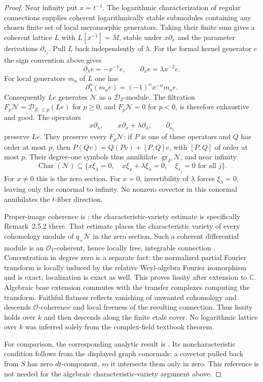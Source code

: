 \documentclass[11pt]{article}
\numberwithin{equation}{section}
\theoremstyle{definition}
\theoremstyle{remark}
\newcommand{\C}{\mathbb C}
\newcommand{\Ocal}{\mathcal O}
\newcommand{\Dcal}{\mathcal D}
\newcommand{\Ncal}{\mathcal N}
\newcommand{\gr}{\operatorname{gr}}
\begin{document}
\begin{proof}
Near infinity put $x=t^{-1}$. The logarithmic characterization of
regular connections \cite[Theorem~5.3.7]{HTT} supplies coherent
logarithmically stable submodules containing any chosen finite set of
local meromorphic generators. Taking their finite sum gives a coherent
lattice $L$ with $L[x^{-1}]=\overline M$, stable under
$x\partial_x$ and the parameter derivations $\partial_{s_j}$.
Pull $L$ back independently of $\lambda$. For the formal kernel generator
$e$ the sign convention above gives
\[
 \partial_\lambda e=-x^{-1}e,\qquad
 \partial_x e=\lambda x^{-2}e.
\]
For local generators $m_a$ of $L$ one has
\[
 \partial_\lambda^n(m_ae)=(-1)^n x^{-n}m_ae.
\]
Consequently $Le$ generates $\Ncal$ as a $\Dcal_Z$-module. The filtration
$F_p\Ncal=\Dcal_{Z,\le p}(Le)$ for $p\ge0$, and $F_p\Ncal=0$ for $p<0$,
is therefore exhaustive and good. The operators
\[
 x\partial_\lambda,\qquad
 x\partial_x+\lambda\partial_\lambda,\qquad
 \partial_{s_j}
\]
preserve $Le$. They preserve every $F_p\Ncal$: if $P$ is one of these
operators and $Q$ has order at most $p$, then
$P(Qv)=Q(Pv)+[P,Q]v$, with $[P,Q]$ of order at most $p$.
Their degree-one symbols thus annihilate $\gr_F\Ncal$, and near infinity
\begin{equation}\label{eq:fourier-infinity-characteristic}
 \operatorname{Char}(\Ncal)\subseteq
 \{x\xi_\lambda=0,\quad x\xi_x+\lambda\xi_\lambda=0,\quad
                         \xi_{s_j}=0\text{ for all }j\}.
\end{equation}
For $x\ne0$ this is the zero section. For $x=0$, invertibility of
$\lambda$ forces $\xi_\lambda=0$, leaving only the conormal to infinity.
No nonzero covector in this conormal annihilates the $t$-fiber direction.

Proper-image coherence is \cite[Theorem~2.5.1]{HTT}; the
characteristic-variety estimate is specifically Remark~2.5.2 there.
That estimate places the characteristic variety of every cohomology
module of $q_+\Ncal$ in the zero section.
Such a coherent differential module is an $\Ocal_Y$-coherent, hence
locally free, integrable connection \cite[Proposition~2.2.5]{HTT}.
Concentration in degree zero is a separate fact: the normalized partial
Fourier transform is locally induced by the relative Weyl-algebra
Fourier isomorphism and is exact; localization is exact as well.
This proves lissity after extension to $\C$. Algebraic base extension
commutes with the transfer complexes computing the transform. Faithful
flatness reflects vanishing of unwanted cohomology and descends
$\Ocal$-coherence and local freeness of the resulting connection.
Thus lissity holds over $k$ and then descends along the finite etale
cover. No logarithmic lattice over $k$ was inferred solely from the
complex-field textbook theorem.

For comparison, the corresponding analytic result is
\cite[Theorem~1.11(2) and Corollary~1.12]{DouaiSabbah}.
Its noncharacteristic condition follows from the displayed graph
conormals: a covector pulled back from $S$ has zero $dt$-component,
so it intersects them only in zero. This reference is not needed for
the algebraic characteristic-variety argument above.
\end{proof}
\end{document}
